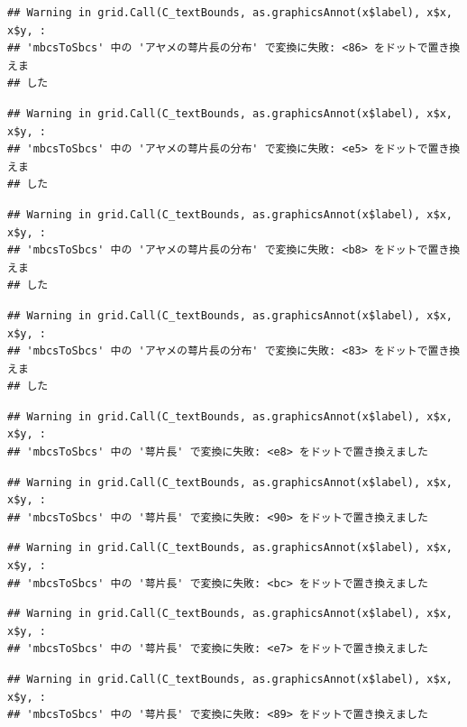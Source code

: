 \documentclass[
]{book}
\begin{document}
\begin{verbatim}
## Warning in grid.Call(C_textBounds, as.graphicsAnnot(x$label), x$x, x$y, :
## 'mbcsToSbcs' 中の 'アヤメの萼片長の分布' で変換に失敗: <86> をドットで置き換えま
## した
\end{verbatim}

\begin{verbatim}
## Warning in grid.Call(C_textBounds, as.graphicsAnnot(x$label), x$x, x$y, :
## 'mbcsToSbcs' 中の 'アヤメの萼片長の分布' で変換に失敗: <e5> をドットで置き換えま
## した
\end{verbatim}

\begin{verbatim}
## Warning in grid.Call(C_textBounds, as.graphicsAnnot(x$label), x$x, x$y, :
## 'mbcsToSbcs' 中の 'アヤメの萼片長の分布' で変換に失敗: <b8> をドットで置き換えま
## した
\end{verbatim}

\begin{verbatim}
## Warning in grid.Call(C_textBounds, as.graphicsAnnot(x$label), x$x, x$y, :
## 'mbcsToSbcs' 中の 'アヤメの萼片長の分布' で変換に失敗: <83> をドットで置き換えま
## した
\end{verbatim}

\begin{verbatim}
## Warning in grid.Call(C_textBounds, as.graphicsAnnot(x$label), x$x, x$y, :
## 'mbcsToSbcs' 中の '萼片長' で変換に失敗: <e8> をドットで置き換えました
\end{verbatim}

\begin{verbatim}
## Warning in grid.Call(C_textBounds, as.graphicsAnnot(x$label), x$x, x$y, :
## 'mbcsToSbcs' 中の '萼片長' で変換に失敗: <90> をドットで置き換えました
\end{verbatim}

\begin{verbatim}
## Warning in grid.Call(C_textBounds, as.graphicsAnnot(x$label), x$x, x$y, :
## 'mbcsToSbcs' 中の '萼片長' で変換に失敗: <bc> をドットで置き換えました
\end{verbatim}

\begin{verbatim}
## Warning in grid.Call(C_textBounds, as.graphicsAnnot(x$label), x$x, x$y, :
## 'mbcsToSbcs' 中の '萼片長' で変換に失敗: <e7> をドットで置き換えました
\end{verbatim}

\begin{verbatim}
## Warning in grid.Call(C_textBounds, as.graphicsAnnot(x$label), x$x, x$y, :
## 'mbcsToSbcs' 中の '萼片長' で変換に失敗: <89> をドットで置き換えました
\end{verbatim}
\end{document}
